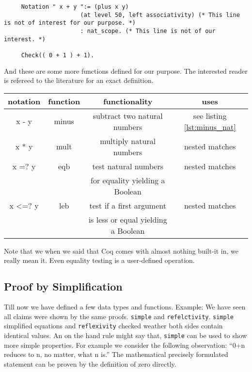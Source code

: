     \begin{lstlisting}
     Notation " x + y ":= (plus x y)
                      (at level 50, left associativity) (* This line is not of interest for our purpose. *)
                      : nat_scope. (* This line is not of our interest. *)
                      
     Check(( 0 + 1 ) + 1).
    \end{lstlisting}    
   And these are some more functions defined for our purpose. 
   The interested reader is refereed to the literature for an exact definition.  
   
   \begin{center}
   \begin{tabular}{|c|c|c|c|}
     \hline 
 	  notation      & function        & functionality                       & uses           \\  \hline
 	  x - y         & minus           & subtract two natural numbers       & see listing  \ref{lst:minus_nat} \\  \hline
      x * y         & mult            & multiply natural numbers            & nested matches \\  \hline   
   	  x =? y        & eqb             & test natural numbers                & nested matches \\  
  	                &                 & for equality yielding a Boolean     &                \\  \hline
   	  x <=? y       & leb             & test if a first argument            & nested matches \\  
   	                &                 & is less or equal yielding a Boolean &                \\  \hline
   \end{tabular}
   \end{center}
	Note that we when we said that Coq comes with almost nothing built-it in, we really mean it.
    Even equality testing is a user-defined operation.
    
    
        
   \subsection{Proof by Simplification}
   
   
   Till now we have defined a few data types and functions.
   Example: We have seen all claims were shown by the same proofs. \lstinline!simple! and \lstinline!refelctivity!. 
   \lstinline!simple! simplified equations and \lstinline!reflexivity! checked weather both sides contain identical values.
   An on the hand rule might say that, \lstinline!simple! can be used to show more simple properties.
   For example we consider the following observation: ``0+n reduces to n, no matter, what n is.''
   The mathematical precisely formulated statement can be proven by the definition of zero directly.
   
